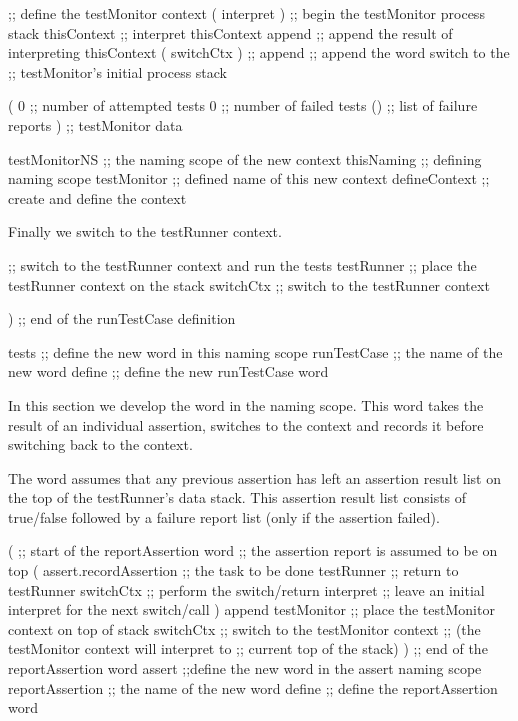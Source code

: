 \startJoylolCode
  ;; define the testMonitor context
  ( interpret ) ;; begin the testMonitor process stack
  thisContext   ;; interpret thisContext 
  append        ;; append the result of interpreting thisContext
  ( switchCtx ) ;; 
  append        ;; append the word switch to the
                ;; testMonitor's initial process stack
  
  ( 
    0           ;; number of attempted tests
    0           ;; number of failed tests
    ()          ;; list of failure reports
  )             ;; testMonitor data

  testMonitorNS ;; the naming scope of the new context
  thisNaming    ;; defining naming scope
  testMonitor   ;; defined name of this new context
  defineContext ;; create and define the context
\stopJoylolCode

Finally we switch to the testRunner context.

\startJoylolCode
  ;; switch to the testRunner context and run the tests
  testRunner ;; place the testRunner context on the stack
  switchCtx  ;; switch to the testRunner context
  
)            ;; end of the runTestCase definition

tests        ;; define the new word in this naming scope
runTestCase  ;; the name of the new word
define       ;; define the new runTestCase word
\stopJoylolCode
\stopTestSuite


In this section we develop the  word in the 
 naming scope. This word takes the result of an individual 
assertion, switches to the  context and records it 
before switching back to the  context. 

The  word assumes that any previous assertion has 
left an assertion result list on the top of the testRunner's data stack. 
This assertion result list consists of true/false followed by a failure 
report list (only if the assertion failed). 

\startJoylolCode
(               ;; start of the reportAssertion word
                ;; the assertion report is assumed to be on top
  (
    assert.recordAssertion  ;; the task to be done
    testRunner  ;; return to testRunner
    switchCtx   ;; perform the switch/return
    interpret   ;; leave an initial interpret for the next switch/call
  )
  append
  testMonitor   ;; place the testMonitor context on top of stack
  switchCtx     ;; switch to the testMonitor context
                ;; (the testMonitor context will interpret to
                ;;  current top of the stack)
)               ;; end of the reportAssertion word
assert          ;;define the new word in the assert naming scope
reportAssertion ;; the name of the new word
define          ;; define the reportAssertion word
\stopJoylolCode
\stopTestSuite

